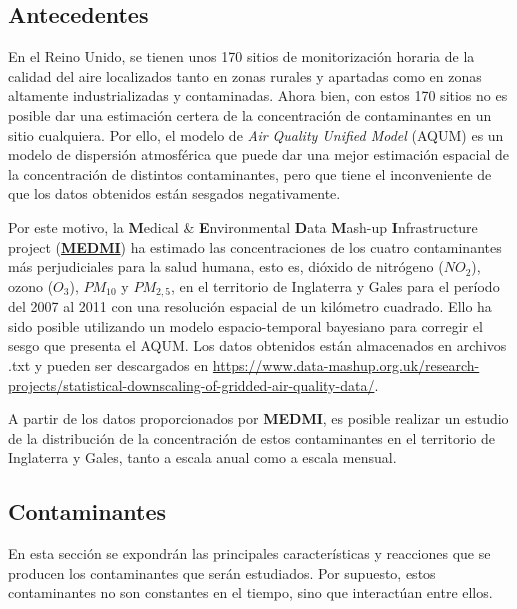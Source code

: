 \documentclass[12pt]{article}
\begin{document}
\normalsize

\subsection{Antecedentes}

En el Reino Unido, se tienen unos 170 sitios de monitorización horaria de la calidad del aire localizados tanto en zonas rurales y apartadas como en zonas altamente industrializadas y contaminadas. Ahora bien, con estos 170 sitios no es posible dar una estimación certera de la concentración de contaminantes en un sitio cualquiera. Por ello, el modelo de \textit{Air Quality Unified Model} (AQUM) es un modelo de dispersión atmosférica que puede dar una mejor estimación espacial de la concentración de distintos contaminantes, pero que tiene el inconveniente de que los datos obtenidos están sesgados negativamente.

Por este motivo, la \textbf{M}edical \& \textbf{E}nvironmental \textbf{D}ata \textbf{M}ash-up \textbf{I}nfrastructure project (\href{https://www.data-mashup.org.uk/}{\textbf{MEDMI}}) ha estimado las concentraciones de los cuatro contaminantes más perjudiciales para la salud humana, esto es, dióxido de nitrógeno ($NO_{2}$), ozono ($O_{3}$), $PM_{10}$ y $PM_{2,5}$, en el territorio de Inglaterra y Gales para el período del 2007 al 2011 con una resolución espacial de un kilómetro cuadrado. Ello ha sido posible utilizando un modelo espacio-temporal bayesiano para corregir el sesgo que presenta el AQUM. Los datos obtenidos están almacenados en archivos .txt y pueden ser descargados en \href{https://www.data-mashup.org.uk/research-projects/statistical-downscaling-of-gridded-air-quality-data/}{https://www.data-mashup.org.uk/research-projects/statistical-downscaling-of-gridded-air-quality-data/}.

A partir de los datos proporcionados por \textbf{MEDMI}, es posible realizar un estudio de la distribución de la concentración de estos contaminantes en el territorio de Inglaterra y Gales, tanto a escala anual como a escala mensual.

\subsection{Contaminantes}

En esta sección se expondrán las principales características y reacciones que se producen los contaminantes que serán estudiados. Por supuesto, estos contaminantes no son constantes en el tiempo, sino que interactúan entre ellos.
\end{document}
